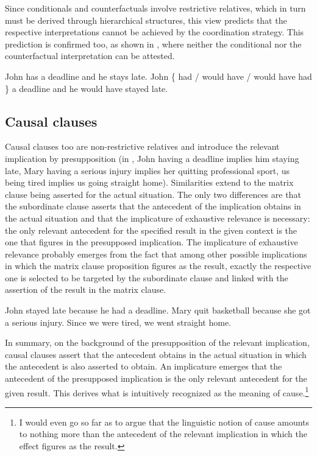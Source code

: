 \documentclass[output=paper]{langscibook}
\begin{document}
\noindent Since conditionals and counterfactuals involve restrictive relatives, which in turn must be derived through hierarchical structures, this view predicts that the respective interpretations cannot be achieved by the coordination strategy. This prediction is confirmed too, as shown in , where neither the conditional nor the counterfactual interpretation can be attested.

\ea\label{ex:CondTest}
\ea John has a deadline and he stays late.\label{ex:CondTest-a}
\ex John \{ had / would have / would have had \} a deadline and he would have stayed late.\label{ex:CondTest-b}
\z\z

\subsection{Causal clauses}

Causal clauses too are non-restrictive relatives and introduce the relevant implication by presupposition (in , John having a deadline implies him staying late, Mary having a serious injury implies her quitting professional sport, us being tired implies us going straight home). Similarities extend to the matrix clause being asserted for the actual situation. The only two differences are that the subordinate clause asserts that the antecedent of the implication obtains in the actual situation and that the implicature of exhaustive relevance is necessary: the only relevant antecedent for the specified result in the given context is the one that figures in the presupposed implication. The implicature of exhaustive relevance probably emerges from the fact that among other possible implications in which the matrix clause proposition figures as the result, exactly the respective one is selected to be targeted by the subordinate clause and linked with the assertion of the result in the matrix clause.

\ea\label{ex:Causal1}
\ea John stayed late because he had a deadline.\label{ex:Causal1-a}
\ex Mary quit basketball because she got a serious injury.\label{ex:Causal1-b}
\ex Since we were tired, we went straight home.\label{ex:Causal1-c}
\z\z

\noindent In summary, on the background of the presupposition of the relevant implication, causal clauses assert that the antecedent obtains in the actual situation in which the antecedent is also asserted to obtain. An implicature emerges that the antecedent of the presupposed implication is the only relevant antecedent for the given result. This derives what is intuitively recognized as the meaning of cause.\footnote{I would even go so far as to argue that the linguistic notion of cause amounts to nothing more than the antecedent of the relevant implication in which the effect figures as the result.}
\end{document}

